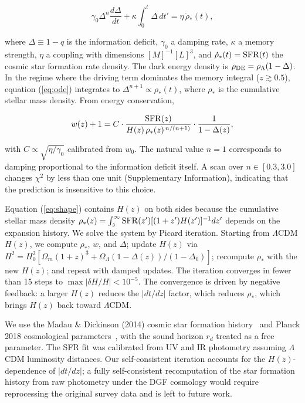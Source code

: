 \documentclass[12pt,a4paper]{article}
\begin{document}
\begin{equation}\label{eq:ode}
\gamma_0\Delta^n\frac{d\Delta}{dt} + \kappa\int_0^t\Delta\,dt' = \eta\,\dot{\rho}_*(t),
\end{equation}

where $\Delta\equiv1-q$ is the information deficit, $\gamma_0$ a damping rate, $\kappa$ a memory strength, $\eta$ a coupling with dimensions $[M]^{-1}[L]^{3}$, and $\dot{\rho}_*(t)={\rm SFR}(t)$ the cosmic star formation rate density. The dark energy density is $\rho_{\rm DE}=\rho_\Lambda(1-\Delta)$. In the regime where the driving term dominates the memory integral ($z\gtrsim0.5$), equation (\ref{eq:ode}) integrates to $\Delta^{n+1}\propto\rho_*(t)$, where $\rho_*$ is the cumulative stellar mass density. From energy conservation,

\begin{equation}\label{eq:shape}
w(z)+1 = C\cdot\frac{{\rm SFR}(z)}{H(z)\,\rho_*(z)^{\,n/(n+1)}}\cdot\frac{1}{1-\Delta(z)},
\end{equation}

with $C\propto\sqrt{\eta/\gamma_0}$ calibrated from $w_0$. The natural value $n=1$ corresponds to damping proportional to the information deficit itself. A scan over $n\in[0.3,3.0]$ changes $\chi^2$ by less than one unit (Supplementary Information), indicating that the prediction is insensitive to this choice.

Equation (\ref{eq:shape}) contains $H(z)$ on both sides because the cumulative stellar mass density $\rho_*(z)=\int_z^\infty{\rm SFR}(z')[(1+z')H(z')]^{-1}dz'$ depends on the expansion history. We solve the system by Picard iteration. Starting from $\Lambda$CDM $H(z)$, we compute $\rho_*$, $w$, and $\Delta$; update $H(z)$ via $H^2=H_0^2[\Omega_m(1+z)^3+\Omega_\Lambda(1-\Delta(z))/(1-\Delta_0)]$; recompute $\rho_*$ with the new $H(z)$; and repeat with damped updates. The iteration converges in fewer than 15 steps to $\max|\delta H/H|<10^{-5}$. The convergence is driven by negative feedback: a larger $H(z)$ reduces the $|dt/dz|$ factor, which reduces $\rho_*$, which brings $H(z)$ back toward $\Lambda$CDM.

We use the Madau \& Dickinson (2014) cosmic star formation history~\cite{madau2014} and Planck 2018 cosmological parameters~\cite{planck2018}, with the sound horizon $r_d$ treated as a free parameter. The SFR fit was calibrated from UV and IR photometry assuming $\Lambda$CDM luminosity distances. Our self-consistent iteration accounts for the $H(z)$-dependence of $|dt/dz|$; a fully self-consistent recomputation of the star formation history from raw photometry under the DGF cosmology would require reprocessing the original survey data and is left to future work.
\end{document}
